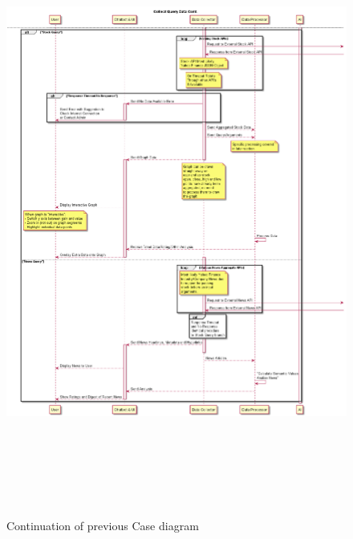 \documentclass[]{IEEEtran}
\begin{document}
	\begin{figure}[h]
	
		\includegraphics[width=\textwidth, height = 20cm]{sequence_001}
		\caption{Continuation of previous Case diagram}
	\end{figure}
	
	
	
\end{document}
